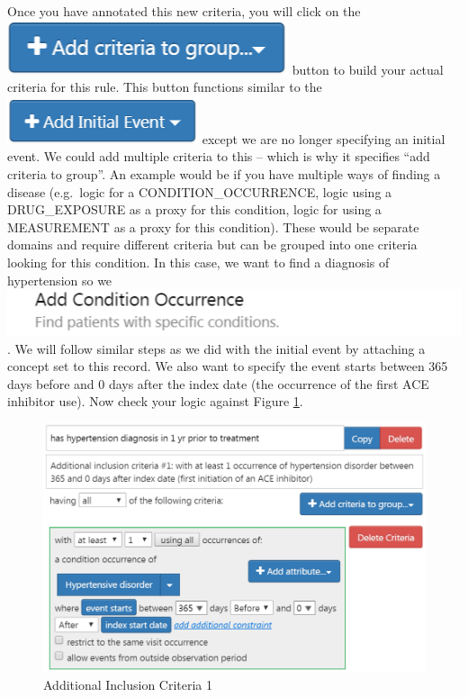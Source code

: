 \documentclass[11pt]{book}
\theoremstyle{definition}
\theoremstyle{definition}
\theoremstyle{definition}
\theoremstyle{remark}
\begin{document}
Once you have annotated this new criteria, you will click on the \includegraphics{images/Cohorts/additionalcriteria.png} button to build your actual criteria for this rule. This button functions similar to the \includegraphics{images/Cohorts/initialevent.png} except we are no longer specifying an initial event. We could add multiple criteria to this -- which is why it specifies ``add criteria to group''. An example would be if you have multiple ways of finding a disease (e.g.~logic for a CONDITION\_OCCURRENCE, logic using a DRUG\_EXPOSURE as a proxy for this condition, logic for using a MEASUREMENT as a proxy for this condition). These would be separate domains and require different criteria but can be grouped into one criteria looking for this condition. In this case, we want to find a diagnosis of hypertension so we \includegraphics{images/Cohorts/add-conditionoccurrence.png}. We will follow similar steps as we did with the initial event by attaching a concept set to this record. We also want to specify the event starts between 365 days before and 0 days after the index date (the occurrence of the first ACE inhibitor use). Now check your logic against Figure \ref{fig:ATLASIC1}.

\begin{figure}

{\centering \includegraphics[width=0.8\linewidth]{images/Cohorts/ATLAS-IC1} 

}

\caption{Additional Inclusion Criteria 1}\label{fig:ATLASIC1}
\end{figure}
\end{document}

